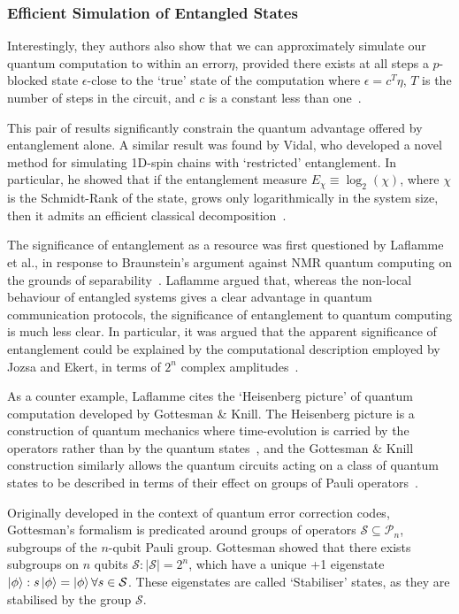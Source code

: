 \documentclass{standalone}
\begin{document}
\subsubsection*{Efficient Simulation of Entangled States}\label{sec:gk}
Interestingly, they authors also show that we can approximately simulate our quantum computation to within an error$\eta$, provided there exists at all steps a $p$-blocked state $\epsilon$-close to the `true' state of the computation where $\epsilon=c^{T}\eta$, $T$ is the number of steps in the circuit, and $c$ is a constant less than one~\cite{Jozsa2003}. 
\par
This pair of results significantly constrain the quantum advantage offered by entanglement alone. A similar result was found by Vidal, who developed a novel method for simulating 1D-spin chains with `restricted' entanglement. In particular, he showed that if the entanglement measure $E_{\chi}\equiv\log_{2}(\chi)$, where $\chi$ is the Schmidt-Rank of the state, grows only logarithmically in the system size, then it admits an efficient classical decomposition~\cite{Vidal2003}.
\par
\par
The significance of entanglement as a resource was first questioned by Laflamme et al., in response to Braunstein's argument against NMR quantum computing on the grounds of separability~\cite{Laflamme2001}. Laflamme argued that, whereas the non-local behaviour of entangled systems gives a clear advantage in quantum communication protocols, the significance of entanglement to quantum computing is much less clear. In particular, it was argued that the apparent significance of entanglement could be explained by the computational description employed by Jozsa and Ekert, in terms of $2^{n}$ complex amplitudes~\cite{Laflamme2001}.
\par
As a counter example, Laflamme cites the `Heisenberg picture' of quantum computation developed by Gottesman \& Knill. The Heisenberg picture is a construction of quantum mechanics where time-evolution is carried by the operators rather than by the quantum states~\cite{Nielsen2000}, and the Gottesman \& Knill construction similarly allows the quantum circuits acting on a class of quantum states to be described in terms of their effect on groups of Pauli operators~\cite{Gottesman1999a}. 
\par
Originally developed in the context of quantum error correction codes, Gottesman's formalism is predicated around groups of operators $\mathcal{S}\subseteq\mathcal{P}_{n}$, subgroups of the $n$-qubit Pauli group. Gottesman showed that there exists subgroups on $n$ qubits $\mathcal{S}:\vert\mathcal{S}\vert=2^{n}$, which have a unique +1 eigenstate $\ket{\phi}:s\ket{\phi}=\ket{\phi}\forall s\in\mathcal{S}$. These eigenstates are called `Stabiliser' states, as they are stabilised by the group $\mathcal{S}$.
\end{document}
